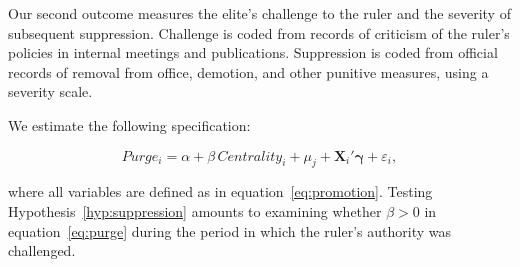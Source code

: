 
Our second outcome measures the elite's challenge to the ruler and the
severity of subsequent suppression. Challenge is coded from records of
criticism of the ruler's policies in internal meetings and publications.
Suppression is coded from official records of removal from office, demotion,
and other punitive measures, using a severity scale.


We estimate the following specification:

\begin{equation}
Purge_i = \alpha + \beta \, Centrality_i + \mu_j + \mathbf{X}_i'
\boldsymbol{\gamma} + \varepsilon_i ,
\label{eq:purge}
\end{equation}

where all variables are defined as in equation~\eqref{eq:promotion}.
Testing Hypothesis~\ref{hyp:suppression} amounts to examining whether
$\beta>0$ in equation~\eqref{eq:purge} during the period in which the ruler's
authority was challenged.
